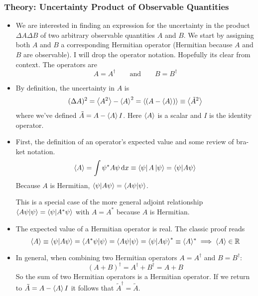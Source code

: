 \documentclass[11pt, a4paper]{article}
\newcommand{\diff}{\mathop{}\!\mathrm{d}} %
\newcommand{\eqtext}[1]{\qquad \text{#1} \qquad}
\begin{document}
\subsubsection{Theory: Uncertainty Product of Observable Quantities}
\begin{itemize}
	\item We are interested in finding an expression for the uncertainty in the product $ \Delta A \Delta B $ of two arbitrary observable quantities $ A $ and $ B $. We start by assigning both $ A $ and $ B $ a corresponding Hermitian operator (Hermitian because $ A $ and $ B $ are observable). I will drop the operator notation. Hopefully its clear from context. The operators are
	\begin{equation*}
		A = A^{\dagger} \eqtext{and} B = B^{\dagger}
	\end{equation*}
	
	\item By definition, the uncertainty in $ A $ is
	\begin{equation*}
		(\Delta A)^{2} = \expval{A^{2}} - \expval{A}^{2} = \expval{(A - \expval{A})} \equiv \big\langle \tilde{A}^{2} \big\rangle
	\end{equation*}
	where we've defined $ \tilde{A} = A - \expval{A}I $. Here $ \expval{A} $ is a scalar and $ I $ is the identity operator. 
	
	\item First, the definition of an operator's expected value and some review of bra-ket notation.
	\begin{equation*}
		\langle A \rangle = \int \psi^{*} A \psi \diff x \equiv \bra{\psi}A\ket{\psi} = \braket{\psi}{A\psi}
	\end{equation*}
	Because $ A $ is Hermitian, $ \braket{\psi}{A\psi} = \braket{A\psi}{\psi} $. 
	
	This is a special case of the more general adjoint relationship $ \braket{A\psi}{\psi} = \braket{\psi}{A^{*}\psi} $ with $ A = A^{*} $ because $ A $ is Hermitian. 
	
	\item The expected value of a Hermitian operator is real. The classic proof reads
	\begin{equation*}
		\langle A \rangle \equiv \braket{\psi}{A\psi} = \braket{A^{*}\psi}{\psi} = \braket{A\psi}{\psi} = \braket{\psi}{A\psi}^{*} \equiv \langle A \rangle^{*} \implies \langle A \rangle \in \mathbb{R}
	\end{equation*}
	
	\item In general, when combining two Hermitian operators $ A = A^{\dagger} $ and $ B = B^{\dagger} $:
	\begin{equation*}
		(A + B)^{\dagger} = A^{\dagger} + B^{\dagger} = A + B
	\end{equation*}
	So the sum of two Hermitian operators is a Hermitian operator. If we return to $ \tilde{A} = A - \expval{A}I  $ it follows that $ \tilde{A}^{\dagger} = \tilde{A} $. 
	

\end{itemize}
\end{document}

